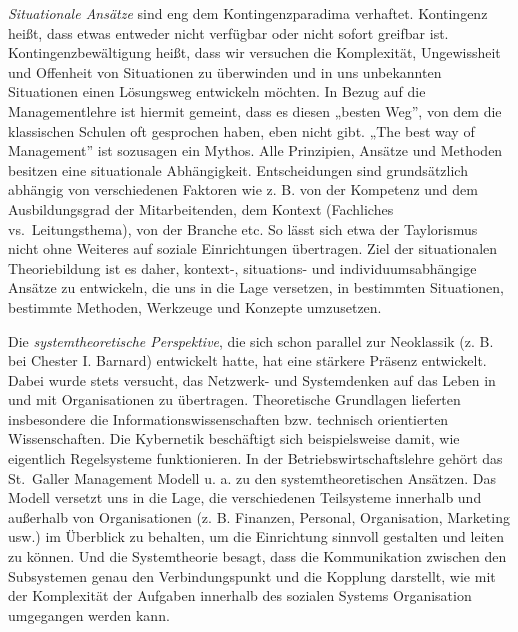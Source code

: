 \documentclass[
  letterpaper,
]{book}
\begin{document}
\emph{Situationale Ansätze} sind eng dem Kontingenzparadima verhaftet.
Kontingenz heißt, dass etwas entweder nicht verfügbar oder nicht sofort
greifbar ist. Kontingenzbewältigung heißt, dass wir versuchen die
Komplexität, Ungewissheit und Offenheit von Situationen zu überwinden
und in uns unbekannten Situationen einen Lösungsweg entwickeln möchten.
In Bezug auf die Managementlehre ist hiermit gemeint, dass es diesen
„besten Weg'', von dem die klassischen Schulen oft gesprochen haben,
eben nicht gibt. „The best way of Management'' ist sozusagen ein Mythos.
Alle Prinzipien, Ansätze und Methoden besitzen eine situationale
Abhängigkeit. Entscheidungen sind grundsätzlich abhängig von
verschiedenen Faktoren wie z. B. von der Kompetenz und dem
Ausbildungsgrad der Mitarbeitenden, dem Kontext (Fachliches
vs.~Leitungsthema), von der Branche etc. So lässt sich etwa der
Taylorismus nicht ohne Weiteres auf soziale Einrichtungen übertragen.
Ziel der situationalen Theoriebildung ist es daher, kontext-,
situations- und individuumsabhängige Ansätze zu entwickeln, die uns in
die Lage versetzen, in bestimmten Situationen, bestimmte Methoden,
Werkzeuge und Konzepte umzusetzen.

Die \emph{systemtheoretische Perspektive}, die sich schon parallel zur
Neoklassik (z. B. bei Chester I. Barnard) entwickelt hatte, hat eine
stärkere Präsenz entwickelt. Dabei wurde stets versucht, das Netzwerk-
und Systemdenken auf das Leben in und mit Organisationen zu übertragen.
Theoretische Grundlagen lieferten insbesondere die
Informationswissenschaften bzw. technisch orientierten Wissenschaften.
Die Kybernetik beschäftigt sich beispielsweise damit, wie eigentlich
Regelsysteme funktionieren. In der Betriebswirtschaftslehre gehört das
St.~Galler Management Modell u. a. zu den systemtheoretischen Ansätzen.
Das Modell versetzt uns in die Lage, die verschiedenen Teilsysteme
innerhalb und außerhalb von Organisationen (z. B. Finanzen, Personal,
Organisation, Marketing usw.) im Überblick zu behalten, um die
Einrichtung sinnvoll gestalten und leiten zu können. Und die
Systemtheorie besagt, dass die Kommunikation zwischen den Subsystemen
genau den Verbindungspunkt und die Kopplung darstellt, wie mit der
Komplexität der Aufgaben innerhalb des sozialen Systems Organisation
umgegangen werden kann.
\end{document}
